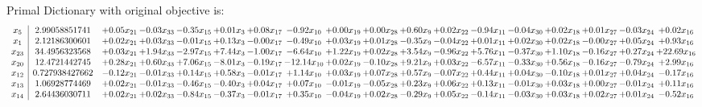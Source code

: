\documentclass[9pt]{article}
\begin{document}
Primal Dictionary with original objective is:
\[\begin{array}{c| c c@{\hskip 2pt} c@{\hskip 2pt} c@{\hskip 2pt} c@{\hskip 2pt} c@{\hskip 2pt} c@{\hskip 2pt} c@{\hskip 2pt} c@{\hskip 2pt} c@{\hskip 2pt} c@{\hskip 2pt} c@{\hskip 2pt} c@{\hskip 2pt} c@{\hskip 2pt} c@{\hskip 2pt} c@{\hskip 2pt} c@{\hskip 2pt} }
 x_{5}   &  2.99058851741 & +  0.05 x_{21} & -0.03 x_{33} & -0.35 x_{15} & +  0.01 x_{3} & +  0.08 x_{17} & -0.92 x_{10} & +  0.00 x_{19} & +  0.00 x_{28} & +  0.60 x_{9} & +  0.02 x_{22} & -0.94 x_{11} & -0.04 x_{30} & +  0.02 x_{18} & +  0.01 x_{27} & -0.03 x_{24} & +  0.02 x_{16}\\
 x_{1}   &  2.12186300601 & +  0.02 x_{21} & +  0.03 x_{33} & -0.01 x_{15} & +  0.13 x_{3} & -0.00 x_{17} & -0.49 x_{10} & +  0.03 x_{19} & +  0.01 x_{28} & -0.35 x_{9} & -0.04 x_{22} & +  0.01 x_{11} & +  0.02 x_{30} & +  0.02 x_{18} & -0.00 x_{27} & +  0.05 x_{24} & +  0.93 x_{16}\\
 x_{23}   &  34.4956323568 & +  0.03 x_{21} & +  1.94 x_{33} & -2.97 x_{15} & +  7.44 x_{3} & -1.00 x_{17} & -6.64 x_{10} & +  1.22 x_{19} & +  0.02 x_{28} & +  3.54 x_{9} & -0.96 x_{22} & +  5.76 x_{11} & -0.37 x_{30} & +  1.10 x_{18} & -0.16 x_{27} & +  0.27 x_{24} & + 22.69 x_{16}\\
 x_{20}   &  12.4721442745 & +  0.28 x_{21} & +  0.60 x_{33} & +  7.06 x_{15} & -8.01 x_{3} & -0.19 x_{17} & -12.14 x_{10} & +  0.02 x_{19} & -0.10 x_{28} & +  9.21 x_{9} & +  0.03 x_{22} & -6.57 x_{11} & -0.33 x_{30} & +  0.56 x_{18} & -0.16 x_{27} & -0.79 x_{24} & +  2.99 x_{16}\\
 x_{12}   &  0.727938427662 & -0.12 x_{21} & -0.01 x_{33} & +  0.14 x_{15} & +  0.58 x_{3} & -0.01 x_{17} & +  1.14 x_{10} & +  0.03 x_{19} & +  0.07 x_{28} & +  0.57 x_{9} & -0.07 x_{22} & +  0.44 x_{11} & +  0.04 x_{30} & -0.10 x_{18} & +  0.01 x_{27} & +  0.04 x_{24} & -0.17 x_{16}\\
 x_{13}   &  1.06928774469 & +  0.02 x_{21} & -0.01 x_{33} & -0.46 x_{15} & -0.40 x_{3} & +  0.04 x_{17} & +  0.07 x_{10} & -0.01 x_{19} & -0.05 x_{28} & +  0.23 x_{9} & +  0.06 x_{22} & +  0.13 x_{11} & -0.01 x_{30} & +  0.03 x_{18} & +  0.00 x_{27} & -0.01 x_{24} & +  0.11 x_{16}\\
 x_{14}   &  2.64436030711 & +  0.02 x_{21} & +  0.02 x_{33} & -0.84 x_{15} & -0.37 x_{3} & -0.01 x_{17} & +  0.35 x_{10} & -0.04 x_{19} & +  0.02 x_{28} & -0.29 x_{9} & +  0.05 x_{22} & -0.14 x_{11} & -0.03 x_{30} & +  0.03 x_{18} & +  0.02 x_{27} & +  0.01 x_{24} & -0.52 x_{16}\\

\end{array}\]
\end{document}
